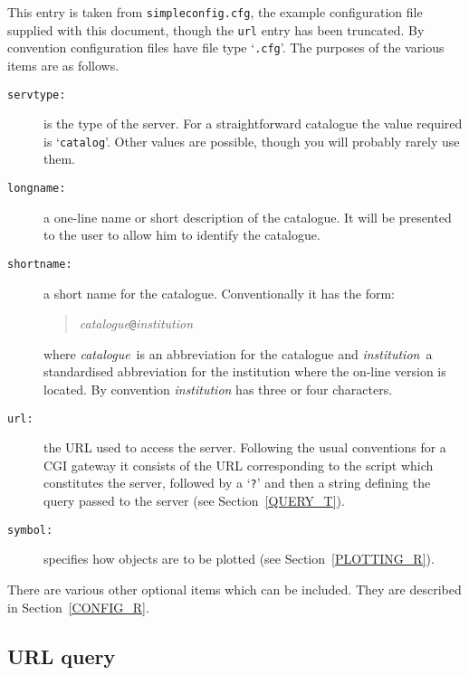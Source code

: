 \documentclass[twoside,11pt]{article}
\renewcommand{\_}{\texttt{\symbol{95}}}
\begin{document}
This entry is taken from {\tt simpleconfig.cfg}, the example configuration
file supplied with this document, though the {\tt url} entry has been
truncated.  By convention configuration files have file type `{\tt .cfg}'.
The purposes of the various items are as follows.

\begin{description}

  \item[{\tt serv\_type:}] is the type of the server.  For a
   straightforward catalogue the value required is `{\tt catalog}'.
   Other values are possible, though you will probably rarely use them.

  \item[{\tt long\_name:}] a one-line name or short description of the
   catalogue.  It will be presented to the user to allow him to identify
   the catalogue.

  \item[{\tt short\_name:}] a short name for the catalogue.  Conventionally
   it has the form:

  \begin{quote}
   {\it catalogue}{\tt @}{\it institution}
  \end{quote}

   where {\it catalogue}\, is an abbreviation for the catalogue and {\it
   institution}\, a standardised abbreviation for the institution where
   the on-line version is located.  By convention {\it institution}\/ has
   three or four characters.

  \item[{\tt url:}] the URL used to access the server.  Following the
   usual conventions for a CGI gateway it consists of the URL corresponding
   to the script which constitutes the server, followed by a `{\tt ?}'
   and then a string defining the query passed to the server (see 
   Section~\ref{QUERY_T}).

  \item[{\tt symbol:}] specifies how objects are to be plotted (see
   Section~\ref{PLOTTING_R}).

\end{description}

There are various other optional items which can be included.  They are
described in Section~\ref{CONFIG_R}.

\subsection{\label{QUERY_T}URL query}
\end{document}

